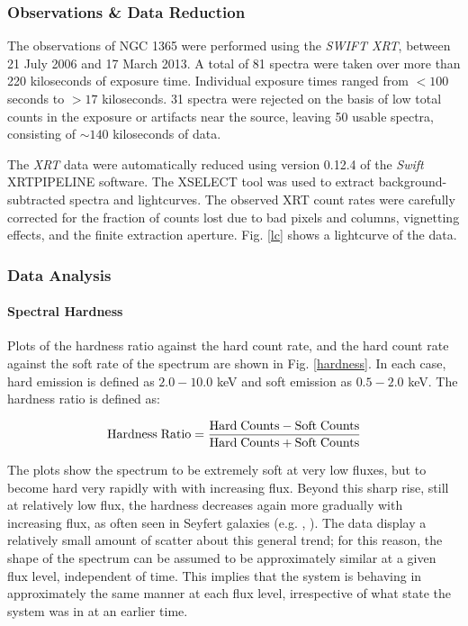 \documentclass[letters,useAMS,usenatbib]{samnote}
\begin{document}
\subsubsection{Observations \& Data Reduction} \label{reduction}

The observations of NGC 1365 were performed using the {\it SWIFT XRT}, between 21 July 2006 and 17 March 2013. A total of 81 spectra were taken over more than 220
kiloseconds of exposure time. Individual exposure times ranged from $<100$ seconds to $>17$ kiloseconds. 31 spectra were rejected on the basis of low total counts in the
exposure or artifacts near the source, leaving 50 usable spectra, consisting of $\sim 140$ kiloseconds of data. 

The {\it XRT} data were automatically reduced using version 0.12.4 of the {\it Swift} XRTPIPELINE software. The XSELECT tool was used to extract background-subtracted
spectra and lightcurves. The observed XRT count rates were carefully corrected for the fraction of counts lost due to bad pixels and columns, vignetting effects, and
the finite extraction aperture. Fig. \ref{lc} shows a lightcurve of the data. 


\subsubsection{Data Analysis}

\paragraph{Spectral Hardness}

Plots of the hardness ratio against the hard count rate, and the hard count rate against the soft rate of the spectrum are shown in Fig. \ref{hardness}.
In each case, hard emission is defined as $2.0 - 10.0$ keV and soft emission as $0.5-2.0$ keV. The hardness ratio is defined as: 

\begin{equation*}
{\rm Hardness\; Ratio = \frac{Hard\;Counts - Soft\;Counts}{Hard\;Counts + Soft\;Counts}}
\\
\end{equation*}

\hspace{1cm}

The plots show the spectrum to be extremely soft at very low fluxes, but to become hard very rapidly with with increasing flux. Beyond this sharp rise, still at
relatively low flux, the hardness decreases again more gradually with increasing flux, as often seen in Seyfert galaxies (e.g. \citet{sobolewska}, \citet{lamer}). 
The data display a relatively small amount of scatter about this general trend; for this reason, the shape of the spectrum can be assumed to be approximately similar at a
given flux level, independent of time. This implies that the system is behaving in approximately the same manner at each flux level, irrespective of what state the system
was in at an earlier time.
\end{document}
